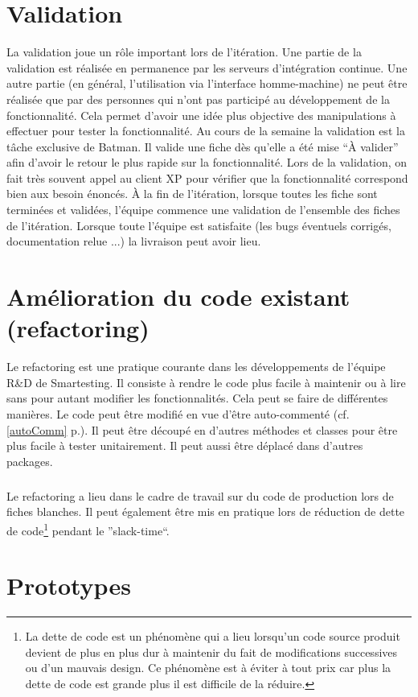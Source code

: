 \section{Validation}
La validation joue un rôle important lors de l'itération. Une partie de la validation est réalisée en permanence par les serveurs d'intégration continue. Une autre partie (en général, l'utilisation via l'interface homme-machine) ne peut être réalisée que par des personnes qui n'ont pas participé au développement de la fonctionnalité. Cela permet d'avoir une idée plus objective des manipulations à effectuer pour tester la fonctionnalité. Au cours de la semaine la validation est la tâche exclusive de Batman. Il valide une fiche dès qu'elle a été mise ``À valider'' afin d'avoir le retour le plus rapide sur la fonctionnalité. Lors de la validation, on fait très souvent appel au client XP pour vérifier que la fonctionnalité correspond bien aux besoin énoncés. À la fin de l'itération, lorsque toutes les fiche sont terminées et validées, l'équipe commence une validation de l'ensemble des fiches de l'itération. Lorsque toute l'équipe est satisfaite (les bugs éventuels corrigés, documentation relue ...) la livraison peut avoir lieu.

\section{Amélioration du code existant (refactoring)}
Le refactoring est une pratique courante dans les développements de l'équipe R\&D de Smartesting. Il consiste à rendre le code plus facile à maintenir ou à lire sans pour autant modifier les fonctionnalités. Cela peut se faire de différentes manières. Le code peut être modifié en vue d'être auto-commenté (cf. \ref{autoComm} p.\pageref{autoComm}). Il peut être découpé en d'autres méthodes et classes pour être plus facile à tester unitairement. Il peut aussi être déplacé dans d'autres packages.

\subparagraph*{}
Le refactoring a lieu dans le cadre de travail sur du code de production lors de fiches blanches. Il peut également être mis en pratique lors de réduction de dette de code\footnote{La dette de code est un phénomène qui a lieu lorsqu'un code source produit devient de plus en plus dur à maintenir du fait de modifications successives ou d'un mauvais design. Ce phénomène est à éviter à tout prix car plus la dette de code est grande plus il est difficile de la réduire.} pendant le ''slack-time``.

\section{Prototypes}


